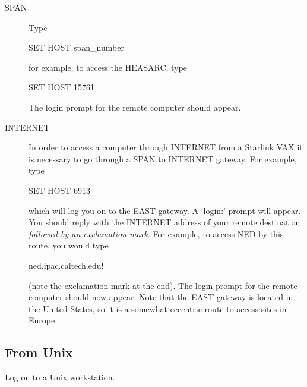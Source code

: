 \documentclass[twoside,11pt,nolof]{starlink}
\begin{document}
\begin{description}

  \item[SPAN] Type

  \begin{terminalv}
    SET  HOST  span_number
  \end{terminalv}

   for example, to access the HEASARC, type

  \begin{terminalv}
    SET  HOST  15761
  \end{terminalv}

   The login prompt for the remote computer should appear.

  \item[INTERNET] In order to access a computer through INTERNET from a
   Starlink VAX it is necessary to go through a SPAN to INTERNET
   gateway. For example, type

  \begin{terminalv}
    SET  HOST  6913
  \end{terminalv}

   which will log you on to the EAST gateway. A `login:' prompt will
   appear. You should reply with the INTERNET address of your remote
   destination \textit{followed by an exclamation mark}. For example,
   to access NED by this route, you would type

  \begin{terminalv}
    ned.ipac.caltech.edu!
  \end{terminalv}

   (note the exclamation mark at the end). The login prompt for the
   remote computer should now appear. Note that the EAST gateway is
   located in the United States, so it is a somewhat eccentric route to
   access sites in Europe.

\end{description}

\subsection{From Unix}

Log on to a Unix workstation.
\end{document}
